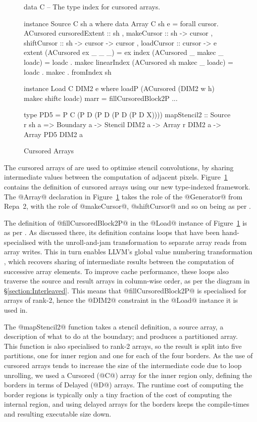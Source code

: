 \begin{figure}
\begin{small}
\begin{code}
data C   -- The type index for cursored arrays.

instance Source C sh a where
  data Array C sh e
     = forall cursor. ACursored
     { cursoredExtent :: sh 
     , makeCursor     :: sh -> cursor
     , shiftCursor    :: sh -> cursor -> cursor
     , loadCursor     :: cursor -> e }
  extent (ACursored ex _     _ _)     = ex
  index  (ACursored _  makec _ loadc) = loadc . makec
  linearIndex (ACursored sh makec _ loadc)
         = loadc . makec . fromIndex sh

instance Load C DIM2 e where
 loadP (ACursored (DIM2 w h) makec shiftc loadc) marr
  = fillCursoredBlock2P ...
        
type PD5 = P C (P D (P D (P D (P D X))))
mapStencil2 :: Source r sh a 
  => Boundary a     -> Stencil DIM2 a
  -> Array r DIM2 a -> Array PD5 DIM2 a
\end{code}
\end{small}
\caption{Cursored Arrays}
\label{figure:Cursored}
\end{figure}

The cursored arrays of \cite{Lippmeier:Stencil} are used to optimise stencil convolutions, by sharing intermediate values between the computation of adjacent pixels. Figure~\ref{figure:Cursored} contains the definition of cursored arrays using our new type-indexed framework. The @Array@ declaration in Figure~\ref{figure:Cursored} takes the role of the @Generator@ from Repa~2, with the role of @makeCursor@, @shiftCursor@ and so on being as per \cite{Lippmeier:Stencil}. 

The definition of @fillCursoredBlock2P@ in the @Load@ instance of Figure~\ref{figure:Cursored} is as per \cite{Lippmeier:Stencil}. As discussed there, its definition contains loops that have been hand-specialised with the unroll-and-jam transformation  \cite{Carr:unroll-and-jam} to separate array reads from array writes. This in turn enables LLVM's global value numbering transformation \cite{Rosen:global-value-nubering}, which recovers sharing of intermediate results between the computation of successive array elements. To improve cache performance, these loops also traverse the source and result arrays in column-wise order, as per the diagram in \S\ref{section:Interleaved}. This means that @fillCursoredBlock2P@ is specialised for arrays of rank-2, hence the @DIM2@ constraint in the @Load@ instance it is used in. 

The @mapStencil2@ function takes a stencil definition, a source array, a description of what to do at the boundary; and produces a partitioned array. This function is also specialised to rank-2 arrays, so the result is split into five partitions, one for inner region and one for each of the four borders. As the use of cursored arrays tends to increase the size of the intermediate code due to loop unrolling, we used a Cursored (@C@) array for the inner region only, defining the borders in terms of Delayed (@D@) arrays. The runtime cost of computing the border regions is typically only a tiny fraction of the cost of computing the internal region, and using delayed arrays for the borders keeps the compile-times and resulting executable size down.
